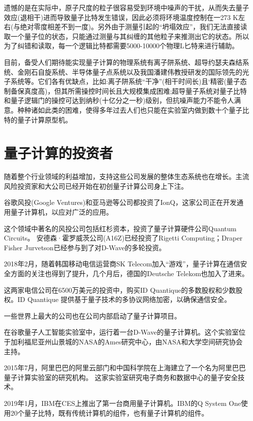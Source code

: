 \documentclass{hfutpaper}
\begin{document}
遗憾的是在实际中，原子尺度的粒子很容易受到环境中噪声的干扰，从而失去量子效应(退相干)进而导致量子比特发生错误，因此必须将环境温度控制在一273 K左右(与绝对零度相差不到一度)。另外由于测量引起的“坍塌效应”，我们无法直接读取一个量子位的状态，只能通过测量与其纠缠的其他粒子来推测出它的状态。所以为了纠错和读取，每一个逻辑比特都需要5000-10000个物理L匕特来进行辅助。

目前，备受人们期待能实现量子计算的物理系统有离子阱系统、超导约瑟夫森结系统、金刚石自旋系统、半导体量子点系统以及我国潘建伟教授研发的国际领先的光子系统等。它们各有优缺点，比如:离子阱系统“干净”(相干时间长)且‘精密(量子态制备保真度高)，但其所需操控时间长且大规模集成困难;超导量子系统对量子比特和量子逻辑门的操控可达到纳秒(十亿分之一秒)级别，但抗噪声能力不能令人满意。种种诸如此类的困难，使得多年过去人们也只能在实验室内做到数十个量子比特的量子计算原型机。

\section{量子计算的投资者}

随着整个行业领域的利益增加，支持这些公司发展的整体生态系统也在增长。主流风险投资家和大公司已经开始在初创量子计算公司身上下注。

谷歌风投(Google Ventures)和亚马逊等公司都投资了IonQ，这家公司正在开发通用量子计算机，以应对广泛的应用。

这个领域中著名的风投公司包括红杉资本，投资了量子计算硬件公司Quantum Circuits。 安德森·霍罗威茨公司(A16Z)已经投资了Rigetti Computing；Draper Fisher Jurvetson已经参与到了对D-Wave的多轮投资。

2018年2月，随着韩国移动电信运营商SK Telecom加入“游戏”，量子计算在通信安全方面的关注也得到了提升，几个月后，德国的Deutsche Telekom也加入了进来。

这两家电信公司在6500万美元的投资中，购买ID Quantique的多数股权和少数股权。ID Quantique 提供基于量子技术的多协议网络加密，以确保通信安全。

一些世界上最大的公司也在公司内部启动了量子计算项目。

在谷歌量子人工智能实验室中，运行着一台D-Wave的量子计算机。这个实验室位于加利福尼亚州山景城的NASA的Ames研究中心，由NASA和大学空间研究协会主持。

2015年7月，阿里巴巴的阿里云部门和中国科学院在上海建立了一个名为阿里巴巴量子计算实验室的研究机构。 这家实验室研究电子商务和数据中心的量子安全技术。

2019年1月，IBM在CES上推出了第一台商用量子计算机。IBM的Q System One使用20个量子比特，既有传统计算机的组件，也有量子计算机的组件。
\end{document}
